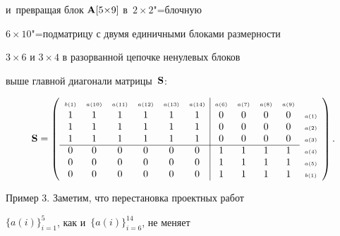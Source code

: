 и~превращая  блок ${\bf A}[5{\times} 9]$ в~$2{\times}2$"=блочную

$6{\times}10$"=подматрицу с двумя единичными блоками размерности

$3{\times}6$ и $3{\times}4$ в разорванной цепочке ненулевых блоков

выше главной диагонали матрицы~${\bf S}$:


$$

{\bf S}= \left(

\begin{array}{cccccc|ccccc}

\scriptscriptstyle b(1)& \scriptscriptstyle a(10)&\scriptscriptstyle a(11)&\scriptscriptstyle a(12)&\scriptscriptstyle a(13)& \scriptscriptstyle a(14)&\multicolumn{1}{c}{\scriptscriptstyle a(6)}&\scriptscriptstyle a(7)&\scriptscriptstyle a(8)&\scriptscriptstyle a(9)&\\

1&1&1&1&1&1&0&0&0&0 &\scriptscriptstyle a(1)\\

1&1&1&1&1&1&0&0&0&0 &\scriptscriptstyle a(2)\\

1&1&1&1&1&1&0&0&0&0 &\scriptscriptstyle a(3)\\ \cline{1-10}

0&0&0&0&0&0&1&1&1&1 &\scriptscriptstyle a(4)\\

0&0&0&0&0&0&1&1&1&1 &\scriptscriptstyle a(5)\\

0&0&0&0&0&0&1&1&1&1 &\scriptscriptstyle b(1)

\end{array}

\right).

$$










\smallskip

{\small \sc Пример 3.} Заметим, что перестановка проектных работ

$\{a(i)\}^{5}_{i=1}$, как и~$\{a(i)\}^{14}_{i=6}$, не меняет

